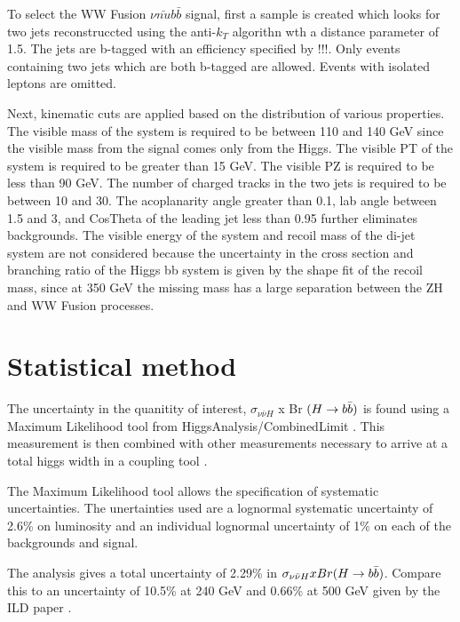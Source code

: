\documentclass[preprintnumbers,nofootinbib,noshowpacs,eqsecnum,prd,superscriptaddress,letterpaper]{revtex4}
\begin{document}
To select the WW Fusion $\nu\bar{nu}b\bar{b}$ signal, first a sample is created which looks for two jets reconstruccted using the anti-$k_T$ algorithn wth a distance parameter of 1.5. The jets are b-tagged with an efficiency specified by !!!. Only events containing two jets which are both b-tagged are allowed. Events with isolated leptons are omitted. 

Next, kinematic cuts are applied based on the distribution of various properties. The visible mass of the system is required to be between 110 and 140 GeV since the visible mass from the signal comes only from the Higgs. The visible PT of the system is required to be greater than 15 GeV. The visible PZ is required to be less than 90 GeV. The number of charged tracks in the two jets is required to be between 10 and 30. The acoplanarity angle greater than 0.1, lab angle between 1.5 and 3, and CosTheta of the leading jet less than 0.95 further eliminates backgrounds. The visible energy of the system and recoil mass of the di-jet system are not considered because the uncertainty in the cross section and branching ratio of the Higgs bb system is given by the shape fit of the recoil mass, since at 350 GeV the missing mass has a large separation between the ZH and WW Fusion processes. 

\section{Statistical method}
\label{sec:method}

The uncertainty in the quanitity of interest, $\sigma_{\nu\bar{\nu}H}$ x Br $(H \rightarrow b\bar{b})$ is found using a Maximum Likelihood tool from HiggsAnalysis/CombinedLimit \cite{higgsanalysis}. This measurement is then combined with other measurements necessary to arrive at a total higgs width in a coupling tool \cite{couplingtool}.

The Maximum Likelihood tool allows the specification of systematic uncertainties. The unertainties used are a lognormal systematic uncertainty of 2.6\% on luminosity and an individual lognormal uncertainty of 1\% on each of the backgrounds and signal.

The analysis gives a total uncertainty of 2.29\% in $\sigma_{\nu\bar{\nu}H} x Br(H \rightarrow b\bar{b})$. Compare this to an uncertainty of 10.5\% at 240 GeV and 0.66\% at 500 GeV given by the ILD paper \cite{ILD}.
\end{document}
